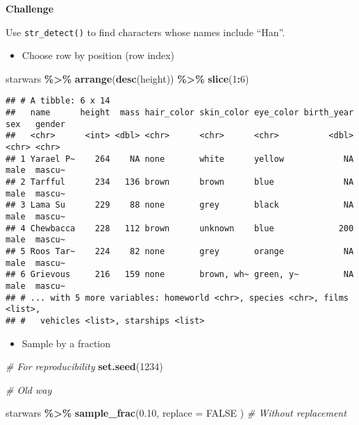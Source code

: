 \documentclass[
]{book}
\newenvironment{Shaded}{\begin{snugshade}}{\end{snugshade}}
\newcommand{\CommentTok}[1]{\textcolor[rgb]{0.56,0.35,0.01}{\textit{#1}}}
\newcommand{\DataTypeTok}[1]{\textcolor[rgb]{0.13,0.29,0.53}{#1}}
\newcommand{\DecValTok}[1]{\textcolor[rgb]{0.00,0.00,0.81}{#1}}
\newcommand{\FloatTok}[1]{\textcolor[rgb]{0.00,0.00,0.81}{#1}}
\newcommand{\KeywordTok}[1]{\textcolor[rgb]{0.13,0.29,0.53}{\textbf{#1}}}
\newcommand{\NormalTok}[1]{#1}
\newcommand{\OperatorTok}[1]{\textcolor[rgb]{0.81,0.36,0.00}{\textbf{#1}}}
\newcommand{\OtherTok}[1]{\textcolor[rgb]{0.56,0.35,0.01}{#1}}
\newcommand{\StringTok}[1]{\textcolor[rgb]{0.31,0.60,0.02}{#1}}
\providecommand{\tightlist}{%
  \setlength{\itemsep}{0pt}\setlength{\parskip}{0pt}}
\begin{document}
\textbf{Challenge}

Use \texttt{str\_detect()} to find characters whose names include ``Han''.

\begin{itemize}
\tightlist
\item
  Choose row by position (row index)
\end{itemize}

\begin{Shaded}
\begin{Highlighting}[]
\NormalTok{starwars }\OperatorTok{\%\textgreater{}\%}
\StringTok{  }\KeywordTok{arrange}\NormalTok{(}\KeywordTok{desc}\NormalTok{(height)) }\OperatorTok{\%\textgreater{}\%}
\StringTok{  }\KeywordTok{slice}\NormalTok{(}\DecValTok{1}\OperatorTok{:}\DecValTok{6}\NormalTok{)}
\end{Highlighting}
\end{Shaded}

\begin{verbatim}
## # A tibble: 6 x 14
##   name      height  mass hair_color skin_color eye_color birth_year sex   gender
##   <chr>      <int> <dbl> <chr>      <chr>      <chr>          <dbl> <chr> <chr> 
## 1 Yarael P~    264    NA none       white      yellow            NA male  mascu~
## 2 Tarfful      234   136 brown      brown      blue              NA male  mascu~
## 3 Lama Su      229    88 none       grey       black             NA male  mascu~
## 4 Chewbacca    228   112 brown      unknown    blue             200 male  mascu~
## 5 Roos Tar~    224    82 none       grey       orange            NA male  mascu~
## 6 Grievous     216   159 none       brown, wh~ green, y~         NA male  mascu~
## # ... with 5 more variables: homeworld <chr>, species <chr>, films <list>,
## #   vehicles <list>, starships <list>
\end{verbatim}

\begin{itemize}
\tightlist
\item
  Sample by a fraction
\end{itemize}

\begin{Shaded}
\begin{Highlighting}[]
\CommentTok{\# For reproducibility}
\KeywordTok{set.seed}\NormalTok{(}\DecValTok{1234}\NormalTok{)}

\CommentTok{\# Old way}

\NormalTok{starwars }\OperatorTok{\%\textgreater{}\%}
\StringTok{  }\KeywordTok{sample\_frac}\NormalTok{(}\FloatTok{0.10}\NormalTok{,}
    \DataTypeTok{replace =} \OtherTok{FALSE}
\NormalTok{  ) }\CommentTok{\# Without replacement}
\end{Highlighting}
\end{Shaded}
\end{document}

